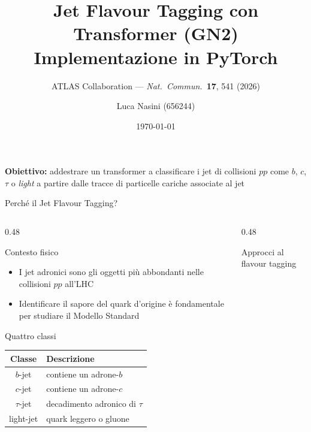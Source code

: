 \documentclass[aspectratio=169, 10pt]{beamer}
\title[GN2 Jet Flavour Tagging]{%
    \textbf{Jet Flavour Tagging con Transformer (GN2)}\\
    \small Implementazione in PyTorch}
\subtitle{ATLAS Collaboration --- \textit{Nat.\ Commun.}\ \textbf{17}, 541 (2026)}
\author{Luca Nasini (656244)}
\date{\today}
\begin{document}
\begin{frame}
    \titlepage
    \vspace{1mm}
    \begin{center}
        \textbf{Obiettivo:} addestrare un transformer a classificare i jet di
        collisioni $pp$ come $b$, $c$, $\tau$ o \textit{light} a partire
        dalle tracce di particelle cariche associate al jet
    \end{center}
\end{frame}


\begin{frame}{Perché il Jet Flavour Tagging?}
    \begin{columns}[T]
        \begin{column}{0.48\textwidth}
            \begin{block}{Contesto fisico}
                \begin{itemize}
                    \item I jet adronici sono gli oggetti più abbondanti nelle collisioni $pp$ all'LHC
                    \item Identificare il sapore del quark d'origine è fondamentale per studiare il Modello Standard
                \end{itemize}
            \end{block}
            \begin{block}{Quattro classi}
                \centering\vspace{2mm}
                \begin{tabular}{cl}
                    \toprule
                    Classe & Descrizione \\
                    \midrule
                    $b$-jet     & contiene un adrone-$b$ \\
                    $c$-jet     & contiene un adrone-$c$ \\
                    $\tau$-jet  & decadimento adronico di $\tau$ \\
                    light-jet   & quark leggero o gluone \\
                    \bottomrule
                \end{tabular}
                \vspace{2mm}
            \end{block}
        \end{column}
        \begin{column}{0.48\textwidth}
            \begin{block}{Approcci al flavour tagging}

\end{block}
\end{column}
\end{columns}
\end{frame}
\end{document}
